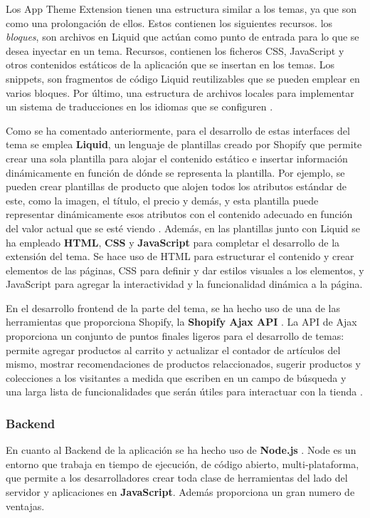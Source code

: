 \documentclass[12pt]{article}
\begin{document}
Los App Theme Extension tienen una estructura similar a los temas, ya que son como una prolongación de ellos. Estos contienen los siguientes recursos. 
los \textit{bloques}, son archivos en Liquid que actúan como punto de entrada para lo que se desea inyectar en un tema.
Recursos, contienen los ficheros CSS, JavaScript y otros contenidos estáticos de la aplicación que se insertan en los temas.
Los snippets, son fragmentos de código Liquid reutilizables que se pueden emplear en varios bloques. Por último, una estructura de archivos locales
para implementar un sistema de traducciones en los idiomas que se configuren \cite{shopify-dev}. 

Como se ha comentado anteriormente, para el desarrollo de estas interfaces del tema se emplea \textbf{Liquid}, un lenguaje de plantillas creado por Shopify que
permite crear una sola plantilla para alojar el contenido estático e insertar información dinámicamente en función de dónde se representa la plantilla.
Por ejemplo, se pueden crear plantillas de producto que alojen todos los atributos estándar de este, como la imagen, el título, el precio y demás, y esta 
plantilla puede representar dinámicamente esos atributos con el contenido adecuado en función del valor actual que se esté viendo \cite{shopify-dev}. 
Además, en las plantillas junto con Liquid se ha empleado \textbf{HTML}, \textbf{CSS} y \textbf{JavaScript} para completar el desarrollo de la extensión del tema. Se hace uso de HTML para estructurar
el contenido y crear elementos de las páginas, CSS para definir y dar estilos visuales a los elementos, y JavaScript para agregar la interactividad y la 
funcionalidad dinámica a la página. 

En el desarrollo frontend de la parte del tema, se ha hecho uso de una de las herramientas que proporciona Shopify, la \textbf{Shopify Ajax API} \cite{shopify-ajax-api}. La API de Ajax
proporciona un conjunto de puntos finales ligeros para el desarrollo de temas: permite agregar productos al carrito y actualizar el contador
de artículos del mismo, mostrar recomendaciones de productos relaccionados, sugerir productos y colecciones a los visitantes a medida que escriben
en un campo de búsqueda y una larga lista de funcionalidades que serán útiles para interactuar con la tienda \cite{shopify-dev}.

\subsubsection{Backend}
En cuanto al Backend de la aplicación se ha hecho uso de \textbf{Node.js} \cite{node}. Node es un entorno que trabaja en tiempo de ejecución, de código abierto, multi-plataforma, 
que permite a los desarrolladores crear toda clase de herramientas del lado del servidor y aplicaciones en \textbf{JavaScript}. 
Además proporciona un gran numero de ventajas. 
\end{document}
